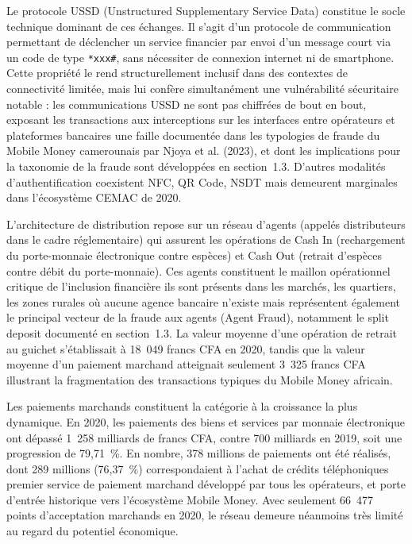 \documentclass[11pt,a4paper,oneside]{report}
\theoremstyle{definition}
\theoremstyle{remark}
\begin{document}
Le protocole USSD (Unstructured Supplementary Service Data) constitue le socle technique dominant de ces échanges. Il s'agit d'un protocole de communication permettant de déclencher un service financier par envoi d'un message court via un code de type \texttt{*xxx\#}, sans nécessiter de connexion internet ni de smartphone. Cette propriété le rend structurellement inclusif dans des contextes de connectivité limitée, mais lui confère simultanément une vulnérabilité sécuritaire notable : les communications USSD ne sont pas chiffrées de bout en bout, exposant les transactions aux interceptions sur les interfaces entre opérateurs et plateformes bancaires  une faille documentée dans les typologies de fraude du Mobile Money camerounais par Njoya et al. (2023), et dont les implications pour la taxonomie de la fraude sont développées en section~1.3. D'autres modalités d'authentification coexistent  NFC, QR Code, NSDT  mais demeurent marginales dans l'écosystème CEMAC de 2020.

L'architecture de distribution repose sur un réseau d'agents (appelés distributeurs dans le cadre réglementaire) qui assurent les opérations de Cash In (rechargement du porte-monnaie électronique contre espèces) et Cash Out (retrait d'espèces contre débit du porte-monnaie). Ces agents constituent le maillon opérationnel critique de l'inclusion financière  ils sont présents dans les marchés, les quartiers, les zones rurales où aucune agence bancaire n'existe  mais représentent également le principal vecteur de la fraude aux agents (Agent Fraud), notamment le split deposit documenté en section~1.3. La valeur moyenne d'une opération de retrait au guichet s'établissait à 18~049 francs CFA en 2020, tandis que la valeur moyenne d'un paiement marchand atteignait seulement 3~325 francs CFA  illustrant la fragmentation des transactions typiques du Mobile Money africain.

Les paiements marchands constituent la catégorie à la croissance la plus dynamique. En 2020, les paiements des biens et services par monnaie électronique ont dépassé 1~258 milliards de francs CFA, contre 700 milliards en 2019, soit une progression de 79,71~\%. En nombre, 378 millions de paiements ont été réalisés, dont 289 millions (76,37~\%) correspondaient à l'achat de crédits téléphoniques  premier service de paiement marchand développé par tous les opérateurs, et porte d'entrée historique vers l'écosystème Mobile Money. Avec seulement 66~477 points d'acceptation marchands en 2020, le réseau demeure néanmoins très limité au regard du potentiel économique.
\end{document}
